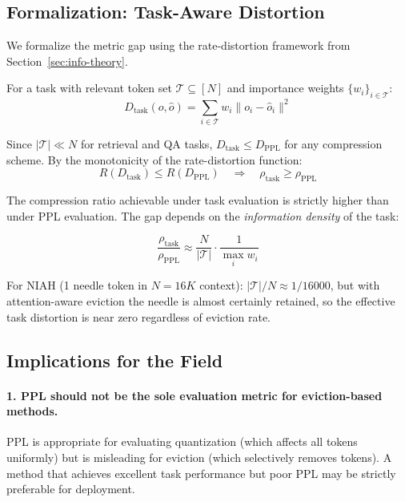 \subsection{Formalization: Task-Aware Distortion}
\label{sec:task-distortion}

We formalize the metric gap using the rate-distortion framework from Section~\ref{sec:info-theory}.

\begin{definition}
For a task with relevant token set $\mathcal{T} \subseteq [N]$ and importance weights $\{w_i\}_{i \in \mathcal{T}}$:
\begin{equation}
    D_{\text{task}}(o, \hat{o}) = \sum_{i \in \mathcal{T}} w_i \|o_i - \hat{o}_i\|^2
\end{equation}
\end{definition}

Since $|\mathcal{T}| \ll N$ for retrieval and QA tasks, $D_{\text{task}} \leq D_{\text{PPL}}$ for any compression scheme. By the monotonicity of the rate-distortion function:
\begin{equation}
    R(D_{\text{task}}) \leq R(D_{\text{PPL}}) \quad \Rightarrow \quad \rho_{\text{task}} \geq \rho_{\text{PPL}}
\end{equation}

The compression ratio achievable under task evaluation is strictly higher than under PPL evaluation. The gap depends on the \emph{information density} of the task:

\begin{equation}
    \frac{\rho_{\text{task}}}{\rho_{\text{PPL}}} \approx \frac{N}{|\mathcal{T}|} \cdot \frac{1}{\max_i w_i}
\end{equation}

For NIAH (1 needle token in $N = 16K$ context): $|\mathcal{T}|/N \approx 1/16000$, but with attention-aware eviction the needle is almost certainly retained, so the effective task distortion is near zero regardless of eviction rate.

\subsection{Implications for the Field}

\paragraph{1. PPL should not be the sole evaluation metric for eviction-based methods.}
PPL is appropriate for evaluating quantization (which affects all tokens uniformly) but is misleading for eviction (which selectively removes tokens). A method that achieves excellent task performance but poor PPL may be strictly preferable for deployment.

